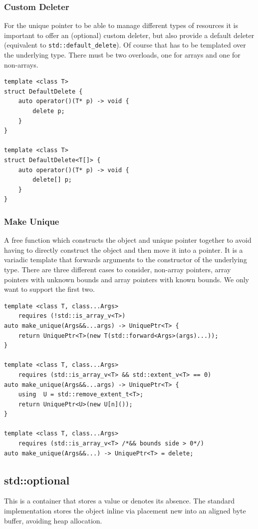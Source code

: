\documentclass{article}
\begin{document}
\subsubsection{Custom Deleter}
For the unique pointer to be able to manage different types of resources it is important to offer an (optional) custom deleter, but also provide a default deleter (equivalent to \texttt{std::default\_delete}). Of course that has to be templated over the underlying type. There must be two overloads, one for arrays and one for non-arrays.
\begin{lstlisting}
template <class T>
struct DefaultDelete {
    auto operator()(T* p) -> void {
        delete p;
    }
}

template <class T>
struct DefaultDelete<T[]> {
    auto operator()(T* p) -> void {
        delete[] p;
    }
}
\end{lstlisting}

\subsubsection{Make Unique}
A free function which constructs the object and unique pointer together to avoid having to directly construct the object and then move it into a pointer. It is a variadic template that forwards arguments to the constructor of the underlying type. There are three different cases to consider, non-array pointers, array pointers with unknown bounds and array pointers with known bounds. We only want to support the first two.
\begin{lstlisting}
template <class T, class...Args>
    requires (!std::is_array_v<T>)
auto make_unique(Args&&...args) -> UniquePtr<T> {
    return UniquePtr<T>(new T(std::forward<Args>(args)...));
}

template <class T, class...Args>
    requires (std::is_array_v<T> && std::extent_v<T> == 0)
auto make_unique(Args&&...args) -> UniquePtr<T> {
    using  U = std::remove_extent_t<T>;
    return UniquePtr<U>(new U[n]());
}

template <class T, class...Args>
    requires (std::is_array_v<T> /*&& bounds side > 0*/)
auto make_unique(Args&&...) -> UniquePtr<T> = delete;
\end{lstlisting}

\subsection{std::optional}
This is a container that stores a value or denotes its absence. The standard implementation stores the object inline via placement new into an aligned byte buffer, avoiding heap allocation.
\end{document}
